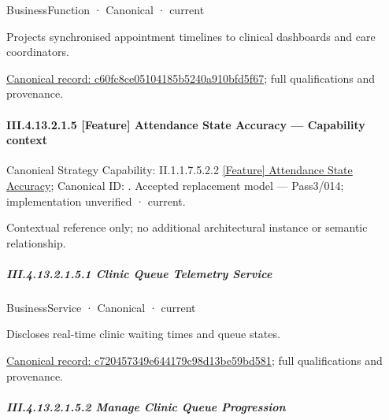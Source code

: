 \label{element:c60fc8ce05104185b5240a910bfd5f67}
{\small BusinessFunction · Canonical · current}\par

Projects synchronised appointment timelines to clinical dashboards and care coordinators.


{\footnotesize \href{../../../../../../../../continuum/business/business-function/c60fc8ce05104185b5240a910bfd5f67.md}{Canonical record: c60fc8ce05104185b5240a910bfd5f67}; full qualifications and provenance.}\par
\paragraph*{III.4.13.2.1.5 [Feature] Attendance State Accuracy — Capability context}
\label{navigation:III.4.13.2.1.5}

{\small Canonical Strategy Capability: II.1.1.7.5.2.2 \hyperref[element:9fd06e573a6144b9a43ecebc8ead3baf]{[Feature] Attendance State Accuracy}; Canonical ID: \texttt{}. Accepted replacement model — Pass3/014; implementation unverified · current.}\par
Contextual reference only; no additional architectural instance or semantic relationship.\par
\subparagraph*{III.4.13.2.1.5.1 Clinic Queue Telemetry Service}
\label{navigation:III.4.13.2.1.5.1}

\label{element:c720457349e644179c98d13be59bd581}
{\small BusinessService · Canonical · current}\par

Discloses real-time clinic waiting times and queue states.


{\footnotesize \href{../../../../../../../../continuum/business/business-service/c720457349e644179c98d13be59bd581.md}{Canonical record: c720457349e644179c98d13be59bd581}; full qualifications and provenance.}\par
\subparagraph*{III.4.13.2.1.5.2 Manage Clinic Queue Progression}
\label{navigation:III.4.13.2.1.5.2}

